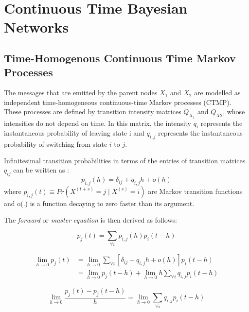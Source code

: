 \section{Continuous Time Bayesian Networks}

\subsection{Time-Homogenous Continuous Time Markov Processes}
The messages that are emitted by the parent nodes $X_{1}$ and $ X_{2} $ are modelled as independent time-homogeneous continuous-time Markov processes (CTMP). These processes are defined by transition intensity matrices $ Q_{X_{1}} $ and $ Q_{X{2}} $, whose intensities do not depend on time. In this matrix, the intensity $ q_{i} $ represents the instantaneous probability of leaving state i and $ q_{i,j} $ represents the instantaneous probability of switching from state $ i $ to $ j $. %

Infinitesimal transition probabilities in terms of the entries of transition matrices $ q_{ij} $ can be written as \cite{Cohn2010a}:
\begin{equation}
p_{i,j}(h)=\delta_{ij}+q_{i,j} h+o(h)
\end{equation}
where $ p_{i, j}(t) \equiv Pr(X^{(t+s)}=j\mid X^{(s)}=i) $ are Markov transition functions and o(.) is a function decaying to zero faster than its argument.

The \textit{forward} or \textit{master equation} is then derived as follows:

\begin{equation}
p_{j}(t)=\sum_{\forall i} p_{i, j}(h) p_{i}(t-h)
\end{equation}

\begin{equation}
\begin{split}
\lim_{h\rightarrow 0} p_{j}(t) & = \lim_{h\rightarrow 0} \sum_{\forall i} \left[ \delta_{ij}+q_{i,j} h+o(h)\right]  p_{i}(t-h) \\ & = \lim_{h\rightarrow 0} p_{j}(t-h) + \lim_{h\rightarrow 0} h \sum_{\forall i} q_{i,j} p_{i}(t-h)
\end{split}
\end{equation}

\begin{equation}
\lim_{h\rightarrow 0} \frac{p_{j}(t) - p_{j}(t-h)}{h} = \lim_{h\rightarrow 0} \sum_{\forall i} q_{i,j} p_{i}(t-h)
\end{equation}

